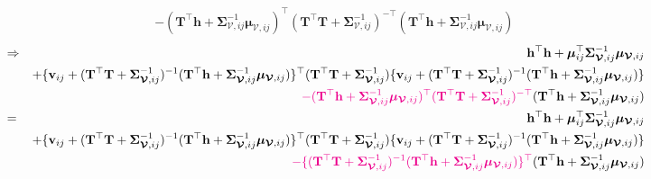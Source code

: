 \documentclass[12pt]{article}
\newcommand{\0}{\mathbf{0}}
\begin{document}
\begin{eqnarray*}
&&- ( \mathbf{T}^{\top} \mathbf{h} + \boldsymbol{\Sigma}_{\boldsymbol{\mathcal{V}}, ij}^{-1}\boldsymbol{\mu}_{\boldsymbol{\mathcal{V}}, ij} )^{\top} ( \mathbf{T}^{\top} \mathbf{T} + \boldsymbol{\Sigma}_{\boldsymbol{\mathcal{V}}, ij}^{-1} )^{-\top} ( \mathbf{T}^{\top} \mathbf{h} + \boldsymbol{\Sigma}_{\boldsymbol{\mathcal{V}}, ij}^{-1}\boldsymbol{\mu}_{\boldsymbol{\mathcal{V}}, ij} )
\end{eqnarray*}
\begin{eqnarray*}
& \Rightarrow & \mathbf{h}^{\top} \mathbf{h} + \boldsymbol{\mu}_{ij}^{\top} \boldsymbol{\Sigma}_{\boldsymbol{\mathcal{V}}, ij}^{-1} \boldsymbol{\mu}_{\boldsymbol{\mathcal{V}}, ij} \\
&& +  \{ \mathbf{v}_{ij} + ( \mathbf{T}^{\top} \mathbf{T} + \boldsymbol{\Sigma}_{\boldsymbol{\mathcal{V}}, ij}^{-1} )^{-1} ( \mathbf{T}^{\top} \mathbf{h} + \boldsymbol{\Sigma}_{\boldsymbol{\mathcal{V}}, ij}^{-1}\boldsymbol{\mu}_{\boldsymbol{\mathcal{V}}, ij} )  \}^{\top} ( \mathbf{T}^{\top} \mathbf{T} + \boldsymbol{\Sigma}_{\boldsymbol{\mathcal{V}}, ij}^{-1} ) \{ \mathbf{v}_{ij} + ( \mathbf{T}^{\top} \mathbf{T} + \boldsymbol{\Sigma}_{\boldsymbol{\mathcal{V}}, ij}^{-1} )^{-1} ( \mathbf{T}^{\top} \mathbf{h} + \boldsymbol{\Sigma}_{\boldsymbol{\mathcal{V}}, ij}^{-1}\boldsymbol{\mu}_{\boldsymbol{\mathcal{V}}, ij} ) \} \\
&& \textcolor{magenta}{- ( \mathbf{T}^{\top} \mathbf{h} + \boldsymbol{\Sigma}_{\boldsymbol{\mathcal{V}}, ij}^{-1}\boldsymbol{\mu}_{\boldsymbol{\mathcal{V}}, ij} )^{\top} ( \mathbf{T}^{\top} \mathbf{T} + \boldsymbol{\Sigma}_{\boldsymbol{\mathcal{V}}, ij}^{-1} )^{-\top} }  ( \mathbf{T}^{\top} \mathbf{h} + \boldsymbol{\Sigma}_{\boldsymbol{\mathcal{V}}, ij}^{-1}\boldsymbol{\mu}_{\boldsymbol{\mathcal{V}}, ij} ) \\
& = & \mathbf{h}^{\top} \mathbf{h} + \boldsymbol{\mu}_{ij}^{\top} \boldsymbol{\Sigma}_{\boldsymbol{\mathcal{V}}, ij}^{-1} \boldsymbol{\mu}_{\boldsymbol{\mathcal{V}}, ij} \\
&& + \{ \mathbf{v}_{ij} + ( \mathbf{T}^{\top} \mathbf{T} + \boldsymbol{\Sigma}_{\boldsymbol{\mathcal{V}}, ij}^{-1} )^{-1} ( \mathbf{T}^{\top} \mathbf{h} + \boldsymbol{\Sigma}_{\boldsymbol{\mathcal{V}}, ij}^{-1}\boldsymbol{\mu}_{\boldsymbol{\mathcal{V}}, ij} ) \}^{\top} ( \mathbf{T}^{\top} \mathbf{T} + \boldsymbol{\Sigma}_{\boldsymbol{\mathcal{V}}, ij}^{-1} )  \{ \mathbf{v}_{ij} + ( \mathbf{T}^{\top} \mathbf{T} + \boldsymbol{\Sigma}_{\boldsymbol{\mathcal{V}}, ij}^{-1} )^{-1}  ( \mathbf{T}^{\top} \mathbf{h} + \boldsymbol{\Sigma}_{\boldsymbol{\mathcal{V}}, ij}^{-1}\boldsymbol{\mu}_{\boldsymbol{\mathcal{V}}, ij} )  \} \\
&& \textcolor{magenta}{- \{ ( \mathbf{T}^{\top} \mathbf{T} + \boldsymbol{\Sigma}_{\boldsymbol{\mathcal{V}}, ij}^{-1} )^{-1} ( \mathbf{T}^{\top} \mathbf{h} + \boldsymbol{\Sigma}_{\boldsymbol{\mathcal{V}}, ij}^{-1}\boldsymbol{\mu}_{\boldsymbol{\mathcal{V}}, ij} ) \}^{\top}}   ( \mathbf{T}^{\top} \mathbf{h} + \boldsymbol{\Sigma}_{\boldsymbol{\mathcal{V}}, ij}^{-1}\boldsymbol{\mu}_{\boldsymbol{\mathcal{V}}, ij} )
\end{eqnarray*}
\end{document}
